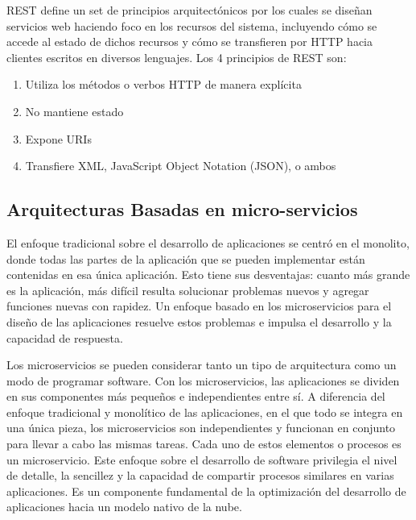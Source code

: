 \documentclass[a4paper,11pt]{book}
\begin{document}
REST define un set de principios arquitectónicos por los cuales se diseñan servicios web haciendo foco en los recursos del sistema, incluyendo cómo se accede al estado de dichos recursos y cómo se transfieren por HTTP hacia clientes escritos en diversos lenguajes. Los 4 principios de REST son: 

\begin{enumerate}
\item Utiliza los métodos o verbos HTTP de manera explícita
\item No mantiene estado
\item Expone URIs
\item Transfiere XML, JavaScript Object Notation (JSON), o ambos
\end{enumerate}

\subsection{Arquitecturas Basadas en micro-servicios}

El enfoque tradicional sobre el desarrollo de aplicaciones se centró en el monolito, donde todas las partes de la aplicación que se pueden implementar están contenidas en esa única aplicación. Esto tiene sus desventajas: cuanto más grande es la aplicación, más difícil resulta solucionar problemas nuevos y agregar funciones nuevas con rapidez. Un enfoque basado en los microservicios para el diseño de las aplicaciones resuelve estos problemas e impulsa el desarrollo y la capacidad de respuesta.

Los microservicios se pueden considerar tanto un tipo de arquitectura como un modo de programar software. Con los microservicios, las aplicaciones se dividen en sus componentes más pequeños e independientes entre sí. A diferencia del enfoque tradicional y monolítico de las aplicaciones, en el que todo se integra en una única pieza, los microservicios son independientes y funcionan en conjunto para llevar a cabo las mismas tareas. Cada uno de estos elementos o procesos es un microservicio. Este enfoque sobre el desarrollo de software privilegia el nivel de detalle, la sencillez y la capacidad de compartir procesos similares en varias aplicaciones. Es un componente fundamental de la optimización del desarrollo de aplicaciones hacia un modelo nativo de la nube.
\end{document}
